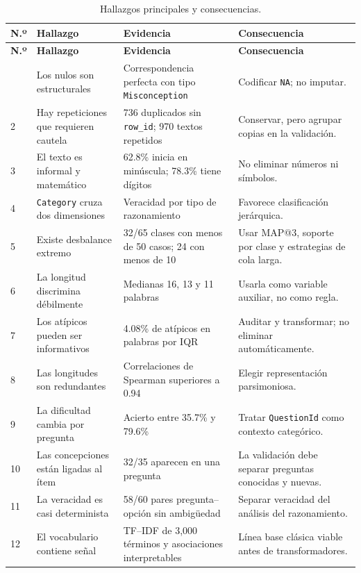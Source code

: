 \documentclass[11pt,oneside,openany]{book}
\newcommand{\codigo}[1]{\texttt{#1}}
\begin{document}
\begin{longtable}{@{}C{0.8cm}p{4.4cm}p{4.1cm}p{4.2cm}@{}}
\caption{Hallazgos principales y consecuencias.}
\label{tab:hallazgos}\\
\toprule
\textbf{N.º} & \textbf{Hallazgo} & \textbf{Evidencia} & \textbf{Consecuencia}\\
\midrule
\endfirsthead
\toprule
\textbf{N.º} & \textbf{Hallazgo} & \textbf{Evidencia} & \textbf{Consecuencia}\\
\midrule
\endhead
\bottomrule
{} & Los nulos son estructurales & Correspondencia perfecta con tipo
\codigo{Misconception} & Codificar \codigo{NA}; no imputar.\\
2 & Hay repeticiones que requieren cautela & 736 duplicados sin
\codigo{row\_id}; 970 textos repetidos & Conservar, pero agrupar copias en la
validación.\\
3 & El texto es informal y matemático & 62.8\% inicia en minúscula; 78.3\% tiene
dígitos & No eliminar números ni símbolos.\\
4 & \codigo{Category} cruza dos dimensiones & Veracidad por tipo de razonamiento
& Favorece clasificación jerárquica.\\
5 & Existe desbalance extremo & 32/65 clases con menos de 50 casos; 24 con
menos de 10 & Usar MAP@3, soporte por clase y estrategias de cola larga.\\
6 & La longitud discrimina débilmente & Medianas 16, 13 y 11 palabras & Usarla
como variable auxiliar, no como regla.\\
7 & Los atípicos pueden ser informativos & 4.08\% de atípicos en palabras por
IQR & Auditar y transformar; no eliminar automáticamente.\\
8 & Las longitudes son redundantes & Correlaciones de Spearman superiores a
0.94 & Elegir representación parsimoniosa.\\
9 & La dificultad cambia por pregunta & Acierto entre 35.7\% y 79.6\% & Tratar
\codigo{QuestionId} como contexto categórico.\\
10 & Las concepciones están ligadas al ítem & 32/35 aparecen en una pregunta &
La validación debe separar preguntas conocidas y nuevas.\\
11 & La veracidad es casi determinista & 58/60 pares pregunta--opción sin
ambigüedad & Separar veracidad del análisis del razonamiento.\\
12 & El vocabulario contiene señal & TF--IDF de 3,000 términos y asociaciones
interpretables & Línea base clásica viable antes de transformadores.\\
\end{longtable}
\end{document}
